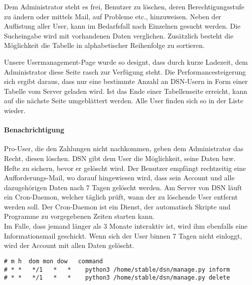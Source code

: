 Dem Administrator steht es frei, Benutzer zu löschen, deren Berechtigungsstufe zu ändern oder mittels Mail, auf Probleme etc., hinzuweisen. Neben der Auflistung aller User, kann im Bedarfsfall nach Einzelnen gesucht werden. Die Sucheingabe wird mit vorhandenen Daten verglichen. Zusätzlich besteht die Möglichkeit die Tabelle in alphabetischer Reihenfolge zu sortieren.


Unsere Usermanagement-Page wurde so designt, dass durch kurze Ladezeit, dem Administrator diese Seite rasch zur Verfügung steht. Die Performancesteigerung sich ergibt daraus, dass nur eine bestimmte Anzahl an DSN-Usern in Form einer Tabelle vom Server geladen wird. Ist das Ende einer Tabellenseite erreicht, kann auf die nächste Seite umgeblättert werden. Alle User finden sich so in der Liste wieder.

\paragraph{Benachrichtigung}
Pro-User, die den Zahlungen nicht nachkommen, geben dem Administrator das Recht, diesen löschen. DSN gibt dem User die Möglichkeit, seine Daten bzw. Hefte zu sichern, bevor er gelöscht wird. Der Benutzer empfängt rechtzeitig eine Aufforderungs-Mail, wo darauf hingewiesen wird, dass sein Account und alle dazugehörigen Daten nach 7 Tagen gelöscht werden. Am Server von DSN läuft ein Cron-Daemon, welcher täglich prüft, wann der zu löschende User entfernt werden soll. \grqq{}Der Cron-Daemon ist ein Dienst, der automatisch Skripte und Programme zu vorgegebenen Zeiten starten kann.\grqq{}\cite{CRON}\\
Im Falle, dass jemand länger als 3 Monate interaktiv ist, wird ihm ebenfalls eine Informationsmail geschickt. Wenn sich der User binnen 7 Tagen nicht einloggt, wird der Account mit allen Daten gelöscht. \cite{COMMANDS}\cite{CRON}

\begin{lstlisting}[caption={Cronjob für die {\"U}berpr{\"u}fung der Inaktivt{\"a}t und L{\"o}schung}]
# m h  dom mon dow   command
# * *   */1   *   *    python3 /home/stable/dsn/manage.py inform
# * *   */1   *   *    python3 /home/stable/dsn/manage.py delete
\end{lstlisting}